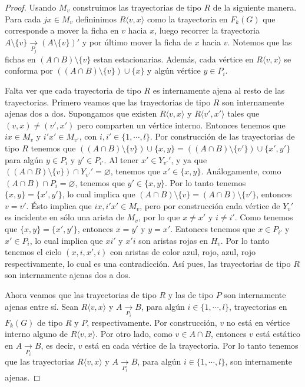 \begin{proof}
    Usando $M_v$ construimos las trayectorias de tipo $R$ de la siguiente
    manera. Para cada $jx \in M_v$ defininimos $R\langle v, x \rangle$ como la
    trayectoria en $F_k(G)$ que corresponde a mover la ficha en $v$ hacia $x$,
    luego recorrer la trayectoria $A\setminus \{v\} \xrightarrow[P_j]{}
    (A\setminus \{v\})'$ y por \'ultimo mover la ficha de $x$ hacia $v$. Notemos
    que las fichas en $(A\cap B)\setminus \{v\}$ estan estacionarias. Adem\'as,
    cada v\'ertice en $R\langle v,x \rangle$ se conforma por $((A\cap
    B)\setminus \{v\}) \cup \{x\}$ y alg\'un v\'ertice $y \in P_i$.

    Falta ver que cada trayectoria de tipo $R$ es internamente ajena al resto de
    las trayectorias. Primero veamos que las trayectorias de tipo $R$ son
    internamente ajenas dos a dos. Supongamos que existen $R \langle v, x
    \rangle$ y $R\langle v',x' \rangle$ tales que $(v,x) \neq (v',x')$ pero
    comparten un v\'ertice interno. Entonces tenemos que $ix \in M_v$ y $i'x'\in
    M_{v'}$, con $i, i' \in \{1, \cdots, l\}$. Por construcci\'on de las
    trayectorias de tipo $R$ tenemos que $((A\cap B)\setminus \{v\}) \cup \{x,
    y\} =((A\cap B)\setminus \{v'\}) \cup \{x', y'\}$ para alg\'un $y \in P_i$ y
    $y' \in P_{i'}$. Al tener $x'\in Y_{v'} '$, y ya que $((A \cap B )\setminus
    \{v\}) \cap Y_{v'}'= \varnothing$, tenemos que $x' \in \{x,y\}$.
    An\'alogamente, como $(A \cap B) \cap P_i = \varnothing$, tenemos que $y'\in
    \{x, y\}$. Por lo tanto tenemos $\{x,y\}= \{x',y'\}$, lo cual implica que
    $(A\cap B)\setminus \{v\} = (A\cap B)\setminus \{v'\}$, entonces $v = v'$.
    \'Esto implica que $ix, i'x' \in M_v$, pero por construcci\'on cada
    v\'ertice de $Y_v '$ es incidente en s\'olo una arista de $M_v$, por lo que
    $x \neq x'$ y $i \neq i'$. Como tenemos que $\{x, y\}=\{x', y'\}$, entonces
    $x=y'$ y $y=x'$. Entonces tenemos que $x \in P_{i'}$ y $x'\in P_i$, lo cual
    implica que $xi'$ y $x'i$ son aristas rojas en $H_v$. Por lo tanto tenemos
    el ciclo $(x, i, x', i)$ con aristas de color azul, rojo, azul, rojo
    respectivamente, lo cual es una contradicci\'on. As\'i pues, las
    trayectorias de tipo $R$ son internamente ajenas dos a dos.

    Ahora veamos que las trayectorias de tipo $R$ y las de tipo $P$ son
    internamente ajenas entre s\'i. Sean $R\langle v,x \rangle$ y $A
    \xrightarrow[P_i]{}  B$, para alg\'un $i \in \{1, \cdots, l\}$, trayectorias
    en $F_k(G)$ de tipo $R$ y $P$, respectivamente. Por construcci\'on, $v$ no
    est\'a en v\'ertice interno alguno de $R \langle v,x \rangle$. Por otro
    lado, como $ v \in A\cap B$, entonces $v$ est\'a est\'atico en $A
    \xrightarrow[P_i]{}  B$, es decir, $v$ est\'a en cada v\'ertice de la
    trayectoria. Por lo tanto tenemos que las trayectorias $R\langle v,x
    \rangle$ y $A \xrightarrow[P_i]{}  B$, para alg\'un $i \in \{1, \cdots, l\}$,
    son internamente ajenas.


\end{proof}

